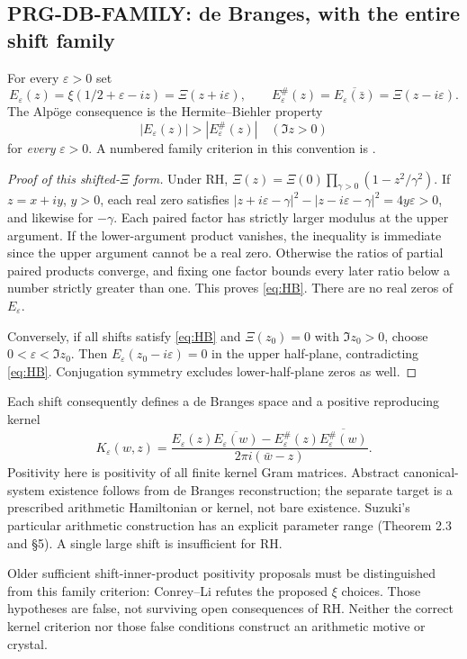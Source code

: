 \subsection{PRG-DB-FAMILY: de Branges, with the entire shift family}
For every $\varepsilon>0$ set
\[
 E_\varepsilon(z)=\xi(1/2+\varepsilon-iz)=\Xi(z+i\varepsilon),\qquad
 E_\varepsilon^\#(z)=\overline{E_\varepsilon(\bar z)}=\Xi(z-i\varepsilon).
\]
The Alp\"oge consequence is the Hermite--Biehler property
\begin{equation}\label{eq:HB}
 |E_\varepsilon(z)|>|E_\varepsilon^\#(z)|\quad(\Im z>0)
\end{equation}
for \emph{every} $\varepsilon>0$. A numbered family criterion in this convention is \cite[Proposition 1.2; (1.3), (1.7), (1.11)]{suzuki}.
\begin{proof}[Proof of this shifted-$\Xi$ form]
Under RH, $\Xi(z)=\Xi(0)\prod_{\gamma>0}(1-z^2/\gamma^2)$. If $z=x+iy$, $y>0$, each real zero satisfies
$|z+i\varepsilon-\gamma|^2-|z-i\varepsilon-\gamma|^2=4y\varepsilon>0$, and likewise for $-\gamma$. Each paired factor has strictly larger modulus at the upper argument. If the lower-argument product vanishes, the inequality is immediate since the upper argument cannot be a real zero. Otherwise the ratios of partial paired products converge, and fixing one factor bounds every later ratio below a number strictly greater than one. This proves \eqref{eq:HB}. There are no real zeros of $E_\varepsilon$.

Conversely, if all shifts satisfy \eqref{eq:HB} and $\Xi(z_0)=0$ with $\Im z_0>0$, choose $0<\varepsilon<\Im z_0$. Then $E_\varepsilon(z_0-i\varepsilon)=0$ in the upper half-plane, contradicting \eqref{eq:HB}. Conjugation symmetry excludes lower-half-plane zeros as well.
\end{proof}
Each shift consequently defines a de Branges space and a positive reproducing kernel
\[
 K_\varepsilon(w,z)=
 \frac{E_\varepsilon(z)\overline{E_\varepsilon(w)}-
 E_\varepsilon^\#(z)\overline{E_\varepsilon^\#(w)}}{2\pi i(\bar w-z)}.
\]
Positivity here is positivity of all finite kernel Gram matrices. Abstract canonical-system existence follows from de Branges reconstruction; the separate target is a prescribed arithmetic Hamiltonian or kernel, not bare existence. Suzuki's particular arithmetic construction has an explicit parameter range (Theorem 2.3 and \S5). A single large shift is insufficient for RH.

Older sufficient shift-inner-product positivity proposals must be distinguished from this family criterion: Conrey--Li \cite[\S3.1, (3.1)--(3.4)]{conreyli} refutes the proposed $\xi$ choices. Those hypotheses are false, not surviving open consequences of RH. Neither the correct kernel criterion nor those false conditions construct an arithmetic motive or crystal.

